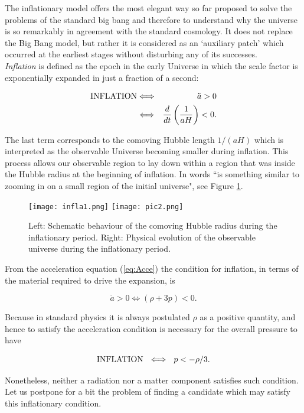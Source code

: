 \documentclass{rmaa}
\def\beq{\begin{equation}}
\def\eeq{\end{equation}}
\def\bea{\begin{eqnarray}}
\def\eea{\end{eqnarray}}
\begin{document}
The inflationary model offers the most elegant way so far proposed to solve the problems
of the standard big bang and therefore to understand why the universe is so remarkably in agreement 
with the standard cosmology. It does not replace the Big Bang model, but rather it is considered 
as an `auxiliary patch' which occurred at the earliest stages without disturbing any of its successes.
\\

\textit{Inflation} is defined as the epoch in the early Universe in which the scale factor 
is exponentially expanded in just a fraction of a second:

\bea \label{eq:inflation}
{\rm INFLATION} &\Longleftrightarrow&~~\ddot a>0 \\
&\Longleftrightarrow& \frac{d}{dt}\left( \frac{{1}}{aH}\right)<0. \label{eq:inflation2}
\eea

\noindent
The last term corresponds to the comoving Hubble length 
$1/(aH)$ which is interpreted as the observable 
Universe becoming smaller during inflation. This process allows our observable
region to lay down within a region that was inside the Hubble radius at the beginning of inflation.
In \citet{Liddle2} words ``is something
similar to zooming in on a small region of the initial universe", see
Figure \ref{fig:Liddle}.
\\

\begin{figure}[t!] 
\texttt{[image: infla1.png]}
\texttt{[image: pic2.png]}
\caption{Left: Schematic behaviour 
of the comoving Hubble radius during the inflationary period. Right: 
Physical evolution of the observable universe during the inflationary period.}%
\label{fig:Liddle}
\end{figure}

From the acceleration equation (\ref{eq:Acce}) the condition for inflation, in 
terms of the material required to drive the expansion, is

\beq
\ddot a>0 \Longleftrightarrow (\rho +3p)<0.
\label{gg}
\eeq

\noindent
Because in standard physics it is always postulated $\rho$ as a positive quantity, and hence
to satisfy the acceleration condition is necessary for the overall pressure to have 

\beq 
{\rm INFLATION} ~~ \Longleftrightarrow~~p<-\rho/3.
\eeq

\noindent
Nonetheless, neither a radiation nor a matter component satisfies such condition. 
Let us postpone for a bit the problem of finding a candidate which may satisfy this inflationary condition.
\end{document}
